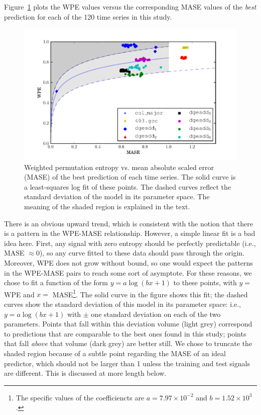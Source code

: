 Figure~\ref{fig:wpe_vs_mase_best} plots the WPE values versus the
corresponding MASE values of the \emph{best} prediction for each of
the 120 time series in this study.
\begin{figure}
  \centering
  \includegraphics[width=1.1\columnwidth]{figs/new_prediction_vs_entropy}
  \caption{Weighted permutation entropy vs. mean absolute scaled error
    (MASE) of the best prediction of each time series.  The solid
    curve is a least-squares log fit of these points.
%
%
The dashed curves reflect the standard deviation of the model in its
parameter space.  The meaning of the shaded region is explained in the
text.}
  \label{fig:wpe_vs_mase_best}
\end{figure}
%
%
There is an obvious upward trend, which is consistent with the notion
that there is a pattern in the WPE-MASE relationship.  However, a
simple linear fit is a bad idea here.  First, any signal with zero
entropy should be perfectly predictable (i.e., MASE $\approx 0$), so
any curve fitted to these data should pass through the origin.
Moreover, WPE does not grow without bound, so one would expect the
patterns in the WPE-MASE pairs to reach some sort of asymptote.  For
these reasons, we chose to fit a function of the form $y = a \log(b x
+ 1)$ to these points, with $y =$ WPE and $x=$ MASE\footnote{The
  specific values of the coefficiencts are $a=7.97 \times 10^{-2}$ and
  $b=1.52 \times 10^3$.}.  The solid curve in the figure shows this
fit; the dashed curves show the standard deviation of this model in
its parameter space: i.e., $y = a \log(b x + 1)$ with $\pm$ one
standard deviation on each of the two parameters.  Points that fall
within this deviation volume (light grey) correspond to predictions
that are comparable to the best ones found in this study; points that
fall \emph{above} that volume (dark grey) are better still.  We chose
to truncate the shaded region because of a subtle point regarding the
MASE of an ideal predictor, which should not be larger than 1 unless
the training and test signals are different.  This is discussed at
more length below.

